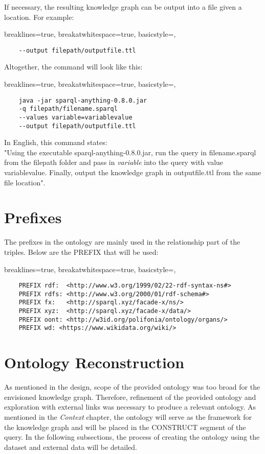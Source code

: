 \noindent If necessary, the resulting knowledge graph can be output into a file given a location. For example:

\lstset
{
    breaklines=true,
    breakatwhitespace=true,
    basicstyle=\ttfamily,
}
\begin{lstlisting}
    --output filepath/outputfile.ttl
\end{lstlisting}

\noindent Altogether, the command will look like this:

\lstset
{
    breaklines=true,
    breakatwhitespace=true,
    basicstyle=\ttfamily,
}
\begin{lstlisting}
    java -jar sparql-anything-0.8.0.jar
    -q filepath/filename.sparql 
    --values variable=variablevalue 
    --output filepath/outputfile.ttl
\end{lstlisting}

\noindent In English, this command states: \\
\hspace*{0.5cm} "Using the executable sparql-anything-0.8.0.jar, run the query in filename.sparql from the filepath folder and pass in \textit{variable} into the query with value variablevalue. Finally, output the knowledge graph in outputfile.ttl from the same file location". 

\section{Prefixes}
\hspace*{0.5cm} The prefixes in the ontology are mainly used in the relationship part of the triples. Below are the PREFIX that will be used:

\lstset
{
    breaklines=true,
    breakatwhitespace=true,
    basicstyle=\ttfamily,
}
\begin{lstlisting}
    PREFIX rdf:  <http://www.w3.org/1999/02/22-rdf-syntax-ns#>
    PREFIX rdfs: <http://www.w3.org/2000/01/rdf-schema#>
    PREFIX fx:   <http://sparql.xyz/facade-x/ns/>
    PREFIX xyz:  <http://sparql.xyz/facade-x/data/>
    PREFIX oont: <http://w3id.org/polifonia/ontology/organs/>
    PREFIX wd: <https://www.wikidata.org/wiki/> 
\end{lstlisting}

\section{Ontology Reconstruction}
\hspace*{0.5cm} As mentioned in the design, scope of the provided ontology was too broad for the envisioned knowledge graph. Therefore, refinement of the provided ontology and exploration with external links was necessary to produce a relevant ontology. As mentioned in the \textit{Context} chapter, the ontology will serve as the framework for the knowledge graph and will be placed in the CONSTRUCT segment of the query. In the following subsections, the process of creating the ontology using the dataset and external data will be detailed.

